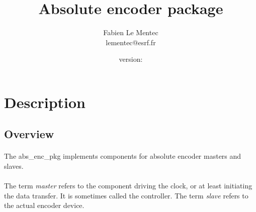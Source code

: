 \documentclass[12pt]{article}
\begin{document}

\newcommand{\todo}[1]
{\paragraph{}\textbf{TODO}: #1}

{\lstset{language=VHDL, basicstyle=\tiny, frame=single}}{}

{\lstset{frame=single}}{}

\newcommand{\longurl}[2]
{\url{#1#2}}

\newcommand{\longlongurl}[3]
{\url{#1#2#3}}

{}{\newcommand{\version}{none}}





\title{Absolute encoder package}
\author{Fabien Le Mentec \\ lementec@esrf.fr}
\date{\small{version: \version}}
\maketitle


\newpage
\setcounter{tocdepth}{2}
\tableofcontents


\newpage
\section{Description}

\subsection{Overview}
\paragraph{}
The abs\_enc\_pkg implements components for absolute encoder masters and
slaves.

\paragraph{}
The term \textit{master} refers to the component driving the clock, or at
least initiating the data transfer. It is sometimes called the controller.
The term \textit{slave} refers to the actual encoder device.
\end{document}

